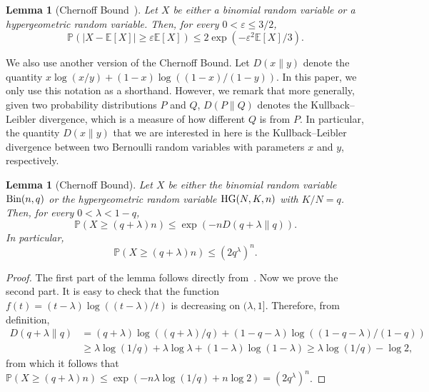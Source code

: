 \documentclass{article}
\theoremstyle{plain}
\newtheorem{lemma}[theorem]{Lemma}
\theoremstyle{definition}
\numberwithin{equation}{section}
\def\eps{\varepsilon}
\begin{document}
\begin{lemma}[Chernoff Bound~{\cite[Corollary 2.3, Theorem 2.10]{JLR}}]\label{lemma:chernoff1}
Let $X$ be either a binomial random variable or a hypergeometric random variable. Then, for every $0<\eps\le 3/2$,
\[\mathbb{P}\left(|X-\mathbb E[X]|\ge \eps\mathbb E[X]\right)\le 2\exp(-\eps^2\mathbb{E}[X]/3).\]
\end{lemma}

We also use another version of the Chernoff Bound. Let $D(x\parallel y)$ denote the quantity $x\log(x/y)+(1-x)\log((1-x)/(1-y))$. In this paper, we only use this notation as a shorthand. However, we remark that more generally, given two probability distributions $P$ and $Q$, $D(P\parallel Q)$ denotes the Kullback--Leibler divergence, which is a measure of how different $Q$ is from $P$. In particular, the quantity $D(x\parallel y)$ that we are interested in here is the Kullback--Leibler divergence between two Bernoulli random variables with parameters $x$ and $y$, respectively.
\begin{lemma}[Chernoff Bound]\label{lemma:chernoff2}
Let $X$ be either the binomial random variable $\textup{Bin}(n,q)$ or the hypergeometric random variable $\textup{HG}(N,K,n)$ with $K/N=q$. Then, for every $0<\lambda<1-q$,
\[\mathbb{P}(X\geq(q+\lambda)n)\leq\exp\left(-nD(q+\lambda\parallel q)\right).\]
In particular, \[\mathbb{P}(X\geq(q+\lambda)n)\leq(2q^\lambda)^n.\]
\end{lemma}
\begin{proof}
The first part of the lemma follows directly from~{\cite[Theorem 1, Theorem 4]{Ho}}. Now we prove the second part. It is easy to check that the function $f(t)=(t-\lambda)\log((t-\lambda)/t)$ is decreasing on $(\lambda,1]$. Therefore, from definition, 
\begin{align*}
D(q+\lambda\parallel q)&=(q+\lambda)\log((q+\lambda)/q)+(1-q-\lambda)\log((1-q-\lambda)/(1-q))\\
&\geq\lambda\log(1/q)+\lambda\log\lambda+(1-\lambda)\log(1-\lambda)\geq\lambda\log(1/q)-\log2,
\end{align*}
from which it follows that $\mathbb{P}(X\geq(q+\lambda)n)\leq\exp\left(-n\lambda\log(1/q)+n\log2\right)=(2q^{\lambda})^n$.
\end{proof}
\end{document}
